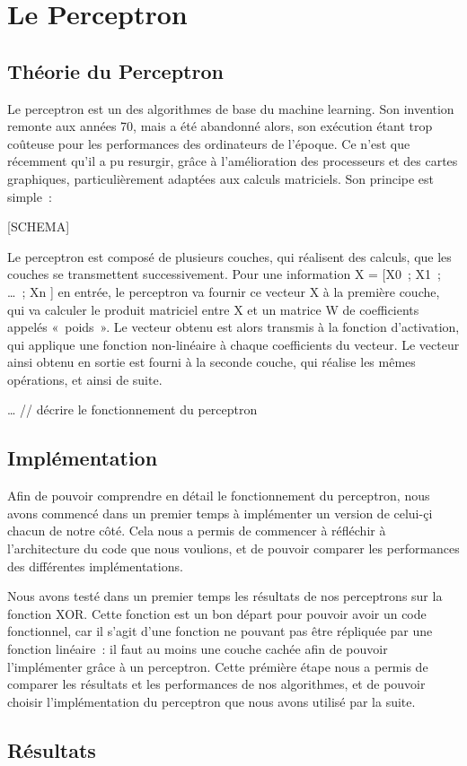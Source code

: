\documentclass[a4paper,10pt]{article}
\newenvironment{bloc infos}[1]{
    \tcolorbox[beamer,%
    noparskip,breakable, oversize,
    colback=green!10!blue!10!white,
    colframe=green!35!blue!35!white,%
    coltitle=black,
    title=#1]}%
    {\endtcolorbox}
\begin{document}
\newpage
\section{Le Perceptron}
\fancyhead[R]{\textit{\nouppercase{\leftmark}}}

\subsection{Théorie du Perceptron}

Le perceptron est un des algorithmes de base du machine learning. Son invention remonte aux années 70, mais a été abandonné alors, son exécution étant trop coûteuse pour les performances des ordinateurs de l’époque. Ce n’est que récemment qu’il a pu resurgir, grâce à l’amélioration des processeurs et des cartes graphiques, particulièrement adaptées aux calculs matriciels.
Son principe est simple : 

[SCHEMA]

Le perceptron est composé de plusieurs couches, qui réalisent des calculs, que les couches se transmettent successivement. Pour une information X  = [X0 ; X1 ; … ; Xn ] en entrée, le perceptron va fournir ce vecteur X à la première couche, qui va calculer le produit matriciel entre X et un matrice W de coefficients appelés « poids ». Le vecteur obtenu est alors transmis à la fonction d’activation, qui applique une fonction non-linéaire à chaque coefficients du vecteur. Le vecteur ainsi obtenu en sortie est fourni à la seconde couche, qui réalise les mêmes opérations, et ainsi de suite. 

… // décrire le fonctionnement du perceptron

\newpage
\subsection{Implémentation}

Afin de pouvoir comprendre en détail le fonctionnement du perceptron, nous avons commencé dans un premier temps à implémenter un version de celui-çi chacun de notre côté. Cela nous a permis de commencer  à réfléchir à l’architecture du code que nous voulions, et de pouvoir comparer les performances des différentes implémentations. 

Nous avons testé dans un premier temps les résultats de nos perceptrons sur la fonction XOR. Cette fonction est un bon départ pour pouvoir avoir un code fonctionnel, car il s’agit d’une fonction ne pouvant pas être répliquée par une fonction linéaire : il faut au moins une couche cachée afin de pouvoir l’implémenter grâce à un perceptron. 
Cette prémière étape nous a permis de comparer les résultats et les performances de nos algorithmes, et de pouvoir choisir l’implémentation du perceptron que nous avons utilisé par la suite.

\newpage

\subsection{Résultats}
\end{document}
